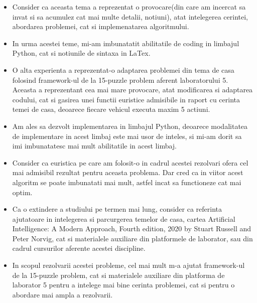 \documentclass{article}
\begin{document}
\begin{flushleft}
    \begin{itemize}
        \item Consider ca aceasta tema a reprezentat o provocare(din care am incercat sa invat si sa acumulez cat mai multe detalii, notiuni), atat intelegerea cerintei, abordarea problemei, cat si implemenatarea algoritmului.
        \vspace{2mm}
        \item In urma acestei teme, mi-am imbunatatit abilitatile de coding in limbajul Python, cat si notiunile de sintaxa in LaTex.
        \vspace{2mm}
        \item O alta experienta a reprezentat-o adaptarea problemei din tema de casa folosind framework-ul de la 15-puzzle problem aferent laboratorului 5. Aceasta a reprezentant cea mai mare provocare, atat modificarea si adaptarea codului, cat si gasirea unei functii euristice admisibile in raport cu cerinta temei de casa, deoarece fiecare vehicul executa maxim 5 actiuni.
        \vspace{2mm}
        \item Am ales sa dezvolt implementarea in limbajul Python, deoarece modalitatea de implementare in acest limbaj este mai usor de inteles, si mi-am dorit sa imi imbunatatesc mai mult abilitatile in acest limbaj.
        \vspace{2mm}
       \item Consider ca euristica pe care am folosit-o in cadrul acestei rezolvari ofera cel mai admisibil rezultat pentru aceasta problema. Dar cred ca in viitor acest algoritm se poate imbunatati mai mult, astfel incat sa functioneze cat mai optim.
       \vspace{2mm}
       \item Ca o extindere a studiului pe termen mai lung, consider ca referinta ajutatoare in intelegerea si parcurgerea temelor de casa, cartea Artificial Intelligence: A Modern Approach, Fourth edition, 2020 by Stuart Russell and Peter Norvig, cat si materialele auxiliare din platformele de laborator, sau din cadrul cursurilor aferente acestei discipline.
       \vspace{2mm}
       \item In scopul rezolvarii acestei probleme, cel mai mult m-a ajutat framework-ul de la 15-puzzle problem, cat si materialele auxiliare din platforma de laborator 5 pentru a intelege mai bine cerinta problemei, cat si pentru o abordare mai ampla a rezolvarii.

\end{itemize}
\end{flushleft}
\end{document}
